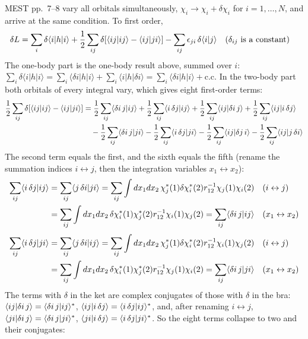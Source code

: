MEST pp.~7--8 vary all orbitals simultaneously, $\chi_i \rightarrow \chi_i + \delta \chi_i$ for $i = 1, \dots, N$, and arrive at the same condition. To first order,
\begin{align*}
\delta L &= \sum_i \delta \langle i|h|i\rangle + \frac{1}{2} \sum_{ij} \delta [\langle ij\vert ij\rangle - \langle ij\vert ji\rangle] - \sum_{ij} \epsilon_{ji}\, \delta \langle i|j\rangle \quad\text{($\delta_{ij}$ is a constant)}
\end{align*}
The one-body part is the one-body result above, summed over $i$: $\sum_i \delta \langle i|h|i\rangle = \sum_i \langle \delta i|h|i\rangle + \sum_i \langle i|h|\delta i\rangle = \sum_i \langle \delta i|h|i\rangle + \text{c.c.}$ In the two-body part both orbitals of every integral vary, which gives eight first-order terms:
\begin{align*}
\frac{1}{2} \sum_{ij} \delta [\langle ij\vert ij\rangle - \langle ij\vert ji\rangle] &= \frac{1}{2} \sum_{ij} \langle \delta i\, j\vert ij\rangle + \frac{1}{2} \sum_{ij} \langle i\, \delta j\vert ij\rangle + \frac{1}{2} \sum_{ij} \langle ij\vert \delta i\, j\rangle + \frac{1}{2} \sum_{ij} \langle ij\vert i\, \delta j\rangle \\
&\quad - \frac{1}{2} \sum_{ij} \langle \delta i\, j\vert ji\rangle - \frac{1}{2} \sum_{ij} \langle i\, \delta j\vert ji\rangle - \frac{1}{2} \sum_{ij} \langle ij\vert \delta j\, i\rangle - \frac{1}{2} \sum_{ij} \langle ij\vert j\, \delta i\rangle
\end{align*}
The second term equals the first, and the sixth equals the fifth (rename the summation indices $i \leftrightarrow j$, then the integration variables $x_1 \leftrightarrow x_2$):
\begin{align*}
\sum_{ij} \langle i\, \delta j\vert ij\rangle &= \sum_{ij} \langle j\, \delta i\vert ji\rangle = \sum_{ij} \int dx_1 dx_2\, \chi_j^*(1) \delta \chi_i^*(2) r_{12}^{-1} \chi_j(1) \chi_i(2) \quad\text{($i \leftrightarrow j$)} \\
&= \sum_{ij} \int dx_1 dx_2\, \delta \chi_i^*(1) \chi_j^*(2) r_{12}^{-1} \chi_i(1) \chi_j(2) = \sum_{ij} \langle \delta i\, j\vert ij\rangle \quad\text{($x_1 \leftrightarrow x_2$)}
\end{align*}
\begin{align*}
\sum_{ij} \langle i\, \delta j\vert ji\rangle &= \sum_{ij} \langle j\, \delta i\vert ij\rangle = \sum_{ij} \int dx_1 dx_2\, \chi_j^*(1) \delta \chi_i^*(2) r_{12}^{-1} \chi_i(1) \chi_j(2) \quad\text{($i \leftrightarrow j$)} \\
&= \sum_{ij} \int dx_1 dx_2\, \delta \chi_i^*(1) \chi_j^*(2) r_{12}^{-1} \chi_j(1) \chi_i(2) = \sum_{ij} \langle \delta i\, j\vert ji\rangle \quad\text{($x_1 \leftrightarrow x_2$)}
\end{align*}
The terms with $\delta$ in the ket are complex conjugates of those with $\delta$ in the bra: $\langle ij\vert \delta i\, j\rangle = \langle \delta i\, j\vert ij\rangle^*$, $\langle ij\vert i\, \delta j\rangle = \langle i\, \delta j\vert ij\rangle^*$, and, after renaming $i \leftrightarrow j$, $\langle ji\vert \delta i\, j\rangle = \langle \delta i\, j\vert ji\rangle^*$, $\langle ji\vert i\, \delta j\rangle = \langle i\, \delta j\vert ji\rangle^*$. So the eight terms collapse to two and their conjugates:
